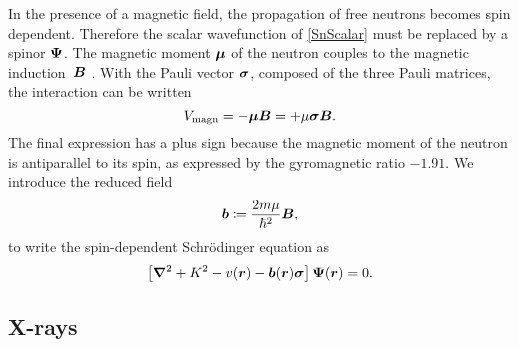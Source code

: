 %
%
%

%
%
%

In the presence of a magnetic field,
the propagation of free neutrons becomes spin dependent.
Therefore the scalar wavefunction of \cref{SnScalar}
must be replaced by a spinor $\bm{\Psi}$.
%
The magnetic moment $\bm{\mu}$ of the neutron
%
%
couples to the magnetic induction~$\bm{B}$ \cite{Sea89,Mez86,MaOB06}.
%
%
With the Pauli vector $\bm{\sigma}$, composed of the three Pauli matrices,
%
%
%
the interaction can be written
\begin{equation}
   V_\text{magn} = -\bm{\mu}\bm{B} = + \mu\bm{\sigma}\bm{B}.
\end{equation}
The final expression has a plus sign because the magnetic moment of the neutron
is antiparallel to its spin,
as expressed by the gyromagnetic ratio $-1.91$.
We introduce the reduced field
\begin{equation}
  \bm{b} \coloneqq \frac{2m\mu}{\hbar^2}\bm{B},
\end{equation}
%
%
to write the spin-dependent Schrödinger equation as
%
\begin{equation}\label{ESchrodi2H}
  \left[\Nabla^2+K^2-v(\r)-\v{b}(\r)\PauliVec\right] \v\Psi(\r) = 0.
\end{equation}
%
%
%

%
%

\subsection{X-rays}\label{SXwave}

